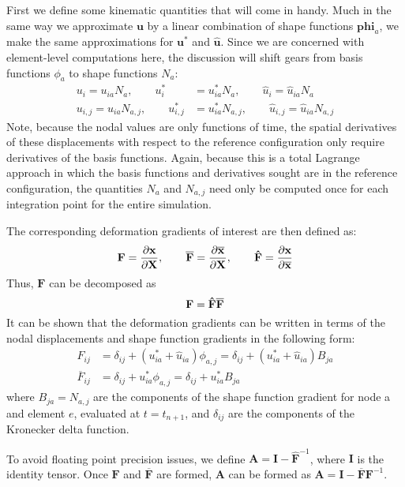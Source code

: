 First we define some kinematic quantities that will come in handy. Much in the same way we approximate $\bm{u}$ by a linear combination of shape functions $\bm{phi}_a$, we make the same approximations for $\bm{u}^*$ and $\hat{\bm{u}}$. Since we are concerned with element-level computations here, the discussion will shift gears from basis functions $\phi_a$ to shape functions $N_a$:
\begin{align}
u_i = u_{ia}N_a, \qquad u^*_i &= u^*_{ia}N_a, \qquad \hat{u}_i = \hat{u}_{ia}N_a \\
u_{i,j} = u_{ia}N_{a,j}, \qquad u^*_{i,j} &= u^*_{ia}N_{a,j}, \qquad \hat{u}_{i,j} = \hat{u}_{ia}N_{a,j}
\end{align}
Note, because the nodal values are only functions of time, the spatial derivatives of these displacements with respect to the reference configuration only require derivatives of the basis functions. Again, because this is a total Lagrange approach in which the basis functions and derivatives sought are in the reference configuration, the quantities $N_a$ and $N_{a,j}$ need only be computed once for each integration point for the entire simulation.

The corresponding deformation gradients of interest are then defined as:
\begin{equation}
\bf{F} = \frac{\partial \bf{x}}{\partial \bf{X}}, \qquad \bf{\overline{F}} = \frac{\partial \bf{\overline{x}}}{\partial \bf{X}}, \qquad \bf{\hat{F}} = \frac{\partial \bf{x}}{\partial \bf{\overline{x}}}
\end{equation}
Thus, $\mathbf{F}$ can be decomposed as
\begin{equation}
\bf{F} = \bf{\hat{F}}\bf{\overline{F}}
\end{equation}
It can be shown that the deformation gradients can be written in terms of the nodal displacements and shape function gradients in the following form:
\begin{align}
F_{ij} &= \delta_{ij} + \left(u^*_{ia} + \hat{u}_{ia} \right) \phi_{a,j} = \delta_{ij} + \left(u^*_{ia} + \hat{u}_{ia} \right) B_{ja} \\
\overline{F}_{ij} &= \delta_{ij} + u^*_{ia} \phi_{a,j} = \delta_{ij} + u^*_{ia} B_{ja}
\end{align}
where $B_{ja} = N_{a,j}$ are the components of the shape function gradient for node a and element $e$, evaluated at $t = t_{n+1}$, and $\delta_{ij}$ are the components of the Kronecker delta function.

To avoid floating point precision issues, we define $\mathbf{A} = \mathbf{I} - \mathbf{\hat{F}}^{-1}$, where $\mathbf{I}$ is the identity tensor. Once $\mathbf{F}$ and $\mathbf{\overline{F}}$ are formed, $\mathbf{A}$ can be formed as $\mathbf{A} = \mathbf{I} - \mathbf{\overline{F}}\mathbf{F}^{-1}$.

